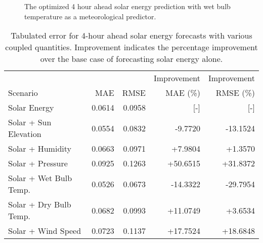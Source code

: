 \begin{figure*}[!ht]
  \centering
  
  \caption{The optimized 4 hour ahead solar energy prediction with wet bulb
  temperature as a meteorological predictor.}
  \label{fig:solar04}
\end{figure*}
  \begin{table*}[!ht]
    \centering
    \caption{Tabulated error for 4-hour ahead solar energy forecasts with various coupled quantities. Improvement indicates the percentage improvement over the base case of forecasting solar energy alone.}
    \label{tab:solar04}
    \begin{tabular}{l|r|r|r|r}
      &  & & Improvement & Improvement \\
      Scenario  & MAE & RMSE & MAE (\%) & RMSE (\%)\\
      \hline
      Solar Energy & 0.0614 & 0.0958 & [-] & [-] \\
      Solar + Sun Elevation & 0.0554 &  0.0832 & -9.7720 & -13.1524 \\
      Solar + Humidity & 0.0663 & 0.0971 & +7.9804 & +1.3570 \\
      Solar + Pressure & 0.0925 & 0.1263 & +50.6515 & +31.8372 \\
      Solar + Wet Bulb Temp. & 0.0526 & 0.0673 & -14.3322 & -29.7954 \\
      Solar + Dry Bulb Temp. & 0.0682 & 0.0993 & +11.0749 & +3.6534 \\
      Solar + Wind Speed & 0.0723 & 0.1137 & +17.7524 & +18.6848 \\
    \end{tabular}
  \end{table*}
